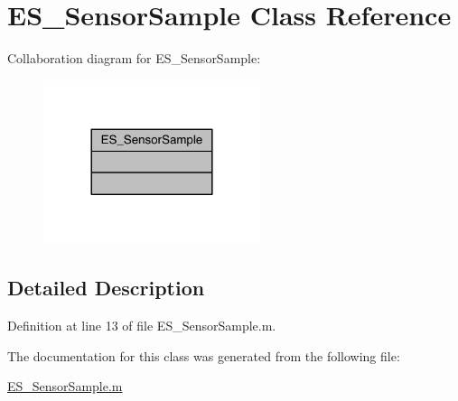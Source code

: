 \hypertarget{class_e_s___sensor_sample}{\section{E\+S\+\_\+\+Sensor\+Sample Class Reference}
\label{class_e_s___sensor_sample}
}


Collaboration diagram for E\+S\+\_\+\+Sensor\+Sample\+:\nopagebreak
\begin{figure}[H]
\begin{center}
\leavevmode
\includegraphics[width=180pt]{de/dff/class_e_s___sensor_sample__coll__graph}
\end{center}
\end{figure}


\subsection{Detailed Description}


Definition at line 13 of file E\+S\+\_\+\+Sensor\+Sample.\+m.



The documentation for this class was generated from the following file\+:\begin{DoxyCompactItemize}
\item 
\hyperlink{_e_s___sensor_sample_8m}{E\+S\+\_\+\+Sensor\+Sample.\+m}\end{DoxyCompactItemize}
